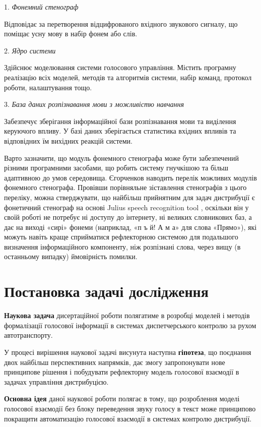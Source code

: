 1. \textit{Фонемний стенограф}

Відповідає за перетворення відцифрованого вхідного звукового сигналу, що поміщає усну мову в набір фонем або слів.

2. \textit{Ядро системи}

Здійснює моделювання системи голосового управління. Містить програмну реалізацію всіх моделей, методів та алгоритмів системи, набір команд, протокол роботи, налаштування тощо.

3. \textit{База даних розпізнавання мови з можливістю навчання}

Забезпечує зберігання інформаційної бази розпізнавання мови та виділення керуючого впливу. У базі даних зберігається статистика вхідних впливів та відповідних їм вихідних реакцій системи.

Варто зазначити, що модуль фонемного стенографа може бути забезпечений різними програмними засобами, що робить систему гнучкішою та більш адаптивною до умов середовища. Єгорченков \cite{Egorchenkov_2016} наводить перелік можливих модулів фонемного стенографа. Провівши порівняльне зіставлення стенографів з цього переліку, можна стверджувати, що найбільш прийнятним для задач дистрибуції є фонетичний стенограф на основі Julius speech recognition tool \cite{Pylypenko_2009}, оскільки він у своїй роботі не потребує ні доступу до інтернету, ні великих словникових баз, а дає на виході «сирі» фонеми (наприклад, «п ъ й! А м а» для слова «Прямо»), які можуть навіть краще сприйматися рефлекторною системою для подальшого визначення інформаційного компоненту, ніж розпізнані слова, через вищу (в останньому випадку) ймовірність помилки.

\section{Постановка задачі дослідження} \label{sect1_6}

\textbf{Наукова задача} дисертаційної роботи полягатиме в розробці моделей і методів формалізації голосової інформації в системах диспетчерського контролю за рухом автотранспорту.

У процесі вирішення наукової задачі висунута наступна \textbf{гіпотеза}, що поєднання двох найбільш перспективних напрямків, дає змогу запропонувати нове принципове рішення і побудувати рефлекторну модель голосової взаємодії в задачах управління дистрибуцією.


\textbf{Основна ідея} даної наукової роботи полягає в тому, що розроблення моделі голосової взаємодії без блоку переведення звуку голосу в текст може принципово покращити автоматизацію голосової взаємодії в системах контролю дистрибуції.

